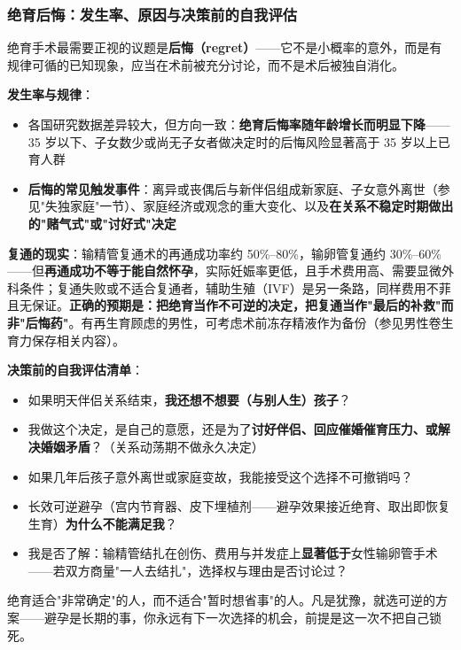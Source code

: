 \subsubsection{绝育后悔：发生率、原因与决策前的自我评估}

绝育手术最需要正视的议题是\textbf{后悔（regret）}——它不是小概率的意外，而是有规律可循的已知现象，应当在术前被充分讨论，而不是术后被独自消化。

\vspace{0.5em}
\noindent\textbf{发生率与规律}：

\begin{itemize}
	\item 各国研究数据差异较大，但方向一致：\textbf{绝育后悔率随年龄增长而明显下降}——35 岁以下、子女数少或尚无子女者做决定时的后悔风险显著高于 35 岁以上已育人群
	\item \textbf{后悔的常见触发事件}：离异或丧偶后与新伴侣组成新家庭、子女意外离世（参见"失独家庭"一节）、家庭经济或观念的重大变化、以及\textbf{在关系不稳定时期做出的"赌气式"或"讨好式"决定}
\end{itemize}

\vspace{0.5em}
\noindent\textbf{复通的现实}：输精管复通术的再通成功率约 50\%--80\%，输卵管复通约 30\%--60\%——但\textbf{再通成功不等于能自然怀孕}，实际妊娠率更低，且手术费用高、需要显微外科条件；复通失败或不适合复通者，辅助生殖（IVF）是另一条路，同样费用不菲且无保证。\textbf{正确的预期是：把绝育当作不可逆的决定，把复通当作"最后的补救"而非"后悔药"}。有再生育顾虑的男性，可考虑术前冻存精液作为备份（参见男性卷生育力保存相关内容）。

\vspace{0.5em}
\noindent\textbf{决策前的自我评估清单}：

\begin{itemize}
	\item 如果明天伴侣关系结束，\textbf{我还想不想要（与别人生）孩子}？
	\item 我做这个决定，是自己的意愿，还是为了\textbf{讨好伴侣、回应催婚催育压力、或解决婚姻矛盾}？（关系动荡期不做永久决定）
	\item 如果几年后孩子意外离世或家庭变故，我能接受这个选择不可撤销吗？
	\item 长效可逆避孕（宫内节育器、皮下埋植剂——避孕效果接近绝育、取出即恢复生育）\textbf{为什么不能满足我}？
	\item 我是否了解：输精管结扎在创伤、费用与并发症上\textbf{显著低于}女性输卵管手术——若双方商量"一人去结扎"，选择权与理由是否讨论过？
\end{itemize}

\begin{tcolorbox}[colback=pink!5!white,colframe=red!50!black,title=贴心小叮咛]
绝育适合"非常确定"的人，而不适合"暂时想省事"的人。凡是犹豫，就选可逆的方案——避孕是长期的事，你永远有下一次选择的机会，前提是这一次不把自己锁死。
\end{tcolorbox}
